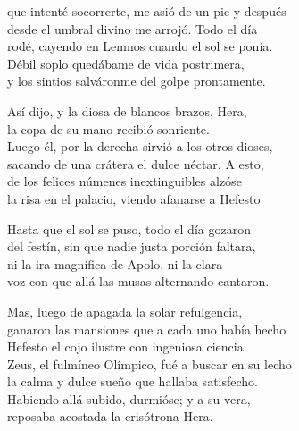 que intenté socorrerte, me asió de un pie y después\\
desde el umbral divino me arrojó. Todo el día\\
rodé, cayendo en Lemnos cuando el sol se ponía.\\
Débil soplo quedábame de vida postrimera,\\
y los sintios salváronme del golpe prontamente.\par
Así dijo, y la diosa de blancos brazos, Hera,\\
la copa de su mano recibió sonriente.\\
Luego él, por la derecha sirvió a los otros dioses,\\
sacando de una crátera el dulce néctar. A esto,\\
de los felices númenes inextinguibles alzóse\\
la risa en el palacio, viendo afanarse a Hefesto\par
Hasta que el sol se puso, todo el día gozaron\\
del festín, sin que nadie justa porción faltara,\\
ni la ira magnífica de Apolo, ni la clara\\
voz con que allá las musas alternando cantaron.\par
Mas, luego de apagada la solar refulgencia,\\
ganaron las mansiones que a cada uno había hecho\\
Hefesto el cojo ilustre con ingeniosa ciencia.\\
Zeus, el fulmíneo Olímpico, fué a buscar en su lecho\\
la calma y dulce sueño que hallaba satisfecho.\\
Habiendo allá subido, durmióse; y a su vera,\\
reposaba acostada la crisótrona Hera.
\poend
\enum